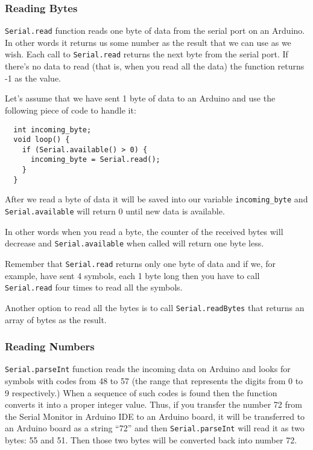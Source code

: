 \documentclass[../sparc.tex]{subfiles}
\begin{document}
\subsubsection{Reading Bytes}

\texttt{Serial.read} function reads one byte of data from the serial port on an
Arduino.  In other words it returns us some number as the result that we can use
as we wish.  Each call to \texttt{Serial.read} returns the next byte from the
serial port.  If there's no data to read (that is, when you read all the data)
the function returns -1 as the value.


Let's assume that we have sent 1 byte of data to an Arduino and use the
following piece of code to handle it:

\begin{verbatim}
  int incoming_byte;
  void loop() {
    if (Serial.available() > 0) {
      incoming_byte = Serial.read();
    }
  }
\end{verbatim}

After we read a byte of data it will be saved into our variable
\texttt{incoming\_byte} and \texttt{Serial.available} will return 0 until new
data is available.

In other words when you read a byte, the counter of the received bytes will
decrease and \texttt{Serial.available} when called will return one byte less.

Remember that \texttt{Serial.read} returns only one byte of data and if we, for
example, have sent 4 symbols, each 1 byte long then you have to call
\texttt{Serial.read} four times to read all the symbols.

Another option to read all the bytes is to call \texttt{Serial.readBytes} that
returns an array of bytes as the result.

\subsubsection{Reading Numbers}

\texttt{Serial.parseInt} function reads the incoming data on Arduino and looks
for symbols with codes from 48 to 57 (the range that represents the digits from
0 to 9 respectively.)  When a sequence of such codes is found then the function
converts it into a proper integer value.  Thus, if you transfer the number 72
from the Serial Monitor in Arduino IDE to an Arduino board, it will be
transferred to an Arduino board as a string ``72'' and then
\texttt{Serial.parseInt} will read it as two bytes: 55 and 51.  Then those two
bytes will be converted back into number 72.
\end{document}

